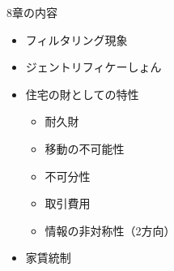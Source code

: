 \documentclass{jsarticle}
\begin{document}
8章の内容
\begin{itemize}
\item フィルタリング現象
\item ジェントリフィケーしょん
\item 住宅の財としての特性
	\begin{itemize}
	\item 耐久財
	\item 移動の不可能性
	\item 不可分性
	\item 取引費用
	\item 情報の非対称性（2方向）
	\end{itemize}
\item 家賃統制
\end{itemize}
\end{document}
